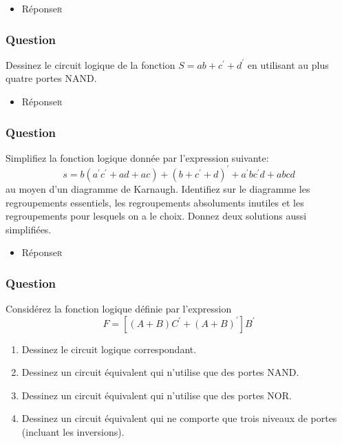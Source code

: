 \documentclass[11pt]{article}
\begin{document}
\begin{itemize}
\item Réponse\hfill{}\textsc{r}
\label{sec:org93b186f}
\end{itemize}

\subsubsection*{Question}
\label{sec:orgc4582ac}
Dessinez le circuit logique de la fonction \(S = a b + c^\prime +
    d^\prime\) en utilisant au plus quatre portes NAND.

\begin{itemize}
\item Réponse\hfill{}\textsc{r}
\label{sec:org9948ce5}
\end{itemize}

\subsubsection*{Question}
\label{sec:org7ed5802}
Simplifiez la fonction logique donnée par l'expression suivante:
  $$
    s = b (a^{\prime} c^{\prime} + a d + a c) + (b + c^{\prime}+
      d)^{\prime} + a^{\prime} b c^{\prime} d + a b c d
    $$ 
  au moyen d'un
  diagramme de Karnaugh. Identifiez sur le diagramme les regroupements
  essentiels, les regroupements absoluments inutiles et les
  regroupements pour lesquels on a le choix. Donnez deux solutions
  aussi simplifiées.

\begin{itemize}
\item Réponse\hfill{}\textsc{r}
\label{sec:org319436d}
\end{itemize}

\subsubsection*{Question}
\label{sec:org8da3f44}
Considérez la fonction logique définie par l'expression 
  $$
    F = [ (A + B) C^{\prime} + (A+B)^{\prime} ] B^{\prime}
    $$

\begin{enumerate}
\item Dessinez le circuit logique correspondant.

\item Dessinez un circuit équivalent qui n'utilise que des portes
NAND.

\item Dessinez un circuit équivalent qui n'utilise que des portes
NOR.

\item Dessinez un circuit équivalent qui ne comporte que trois niveaux de
portes (incluant les inversions).
\end{enumerate}
\end{document}
